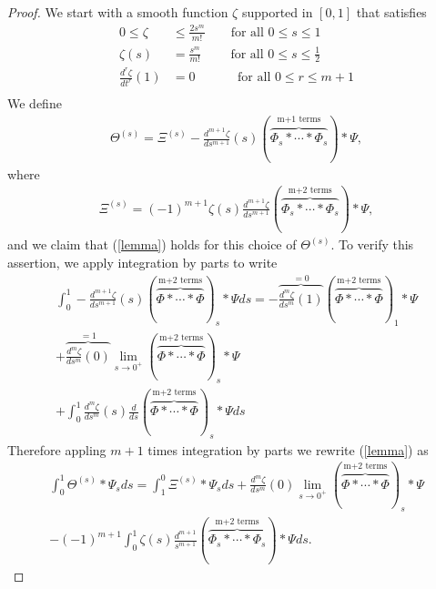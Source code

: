 \documentclass[12pt]{article}  %
\numberwithin{equation}{subsection}
\theoremstyle{plain}
\begin{document}
\begin{proof}
	We start with a smooth function $\zeta$ supported in $[0,1]$ that satisfies
	\begin{align*}
		0\le \zeta &\le \frac{2s^m}{m!} \qquad \text{for all } 0\le s \le 1 \\ 
		\zeta(s) &= \frac{s^m}{m!} \qquad \text{ for all } 0 \le s \le \frac{1}{2} \\
		\frac{d^r\zeta}{dt^r}(1) &= 0 \qquad \quad \text{ for all } 0\le r \le m+1 \\
	\end{align*}
	We define
	\begin{align}
		\varTheta^{(s)} = \varXi^{(s)} - \frac{d^{m+1}\zeta}{ds^{m+1}}(s) \left( \stackrel{\text{m+1 terms}}{\overbrace{\varPhi_s* \cdots *\varPhi_s}}\right) * \varPsi,
	\end{align}
	where
	\begin{align*}
		\varXi^{(s)} = (-1)^{m+1}\zeta(s)\frac{d^{m+1}\zeta}{ds^{m+1}}\left( \stackrel{\text{m+2 terms}}{\overbrace{\varPhi_s* \cdots *\varPhi_s}}\right) * \varPsi,
	\end{align*}
	and we claim that (\ref{lemma}) holds for this choice of $\varTheta^{(s)}$. To verify this assertion, we apply integration by parts to write
	\begin{align*}
		\int_{0}^{1}-\frac{d^{m+1}\zeta}{ds^{m+1}}(s)( \stackrel{\text{m+2 terms}}{\overbrace{\varPhi* \cdots *\varPhi}})_s * \varPsi ds = -\stackrel{=0}{\overbrace{\frac{d^m\zeta}{ds^m}(1)}}( \stackrel{\text{m+2 terms}}{\overbrace{\varPhi* \cdots *\varPhi}})_1 * \varPsi \\
		+\stackrel{=1}{\overbrace{\frac{d^m\zeta}{ds^m}(0)}}\lim_{s\rightarrow 0^+}( \stackrel{\text{m+2 terms}}{\overbrace{\varPhi* \cdots *\varPhi}})_s*\varPsi\\
		+\int_{0}^{1}\frac{d^m\zeta}{ds^m}(s)\frac{d}{ds}( \stackrel{\text{m+2 terms}}{\overbrace{\varPhi* \cdots *\varPhi}})_s*\varPsi ds
	\end{align*}
	Therefore appling $m+1$ times integration by parts we rewrite (\ref{lemma}) as 
	\begin{align*}
		\int_{0}^{1}\varTheta^{(s)}*\varPsi_sds = \int_{1}^{0}\varXi^{(s)}*\varPsi_sds + \frac{d^{m}\zeta}{ds^{m}}(0)\lim_{s\rightarrow 0^+}( \stackrel{\text{m+2 terms}}{\overbrace{\varPhi* \cdots *\varPhi}})_s*\varPsi\\
		-(-1)^{m+1}\int_{0}^{1}\zeta(s)\frac{d^{m+1}}{s^{m+1}}\left( \stackrel{\text{m+2 terms}}{\overbrace{\varPhi_s* \cdots *\varPhi_s}}\right) * \varPsi ds.
	\end{align*}

\end{proof}
\end{document}
